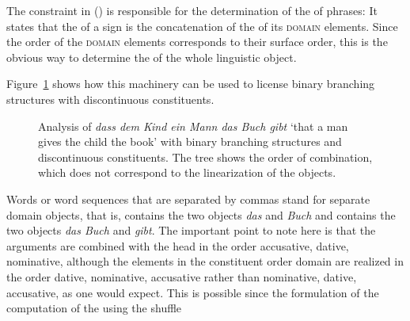 \documentclass[output=paper]{langsci/langscibook}
\begin{document}
The constraint in () is responsible for the determination of the \phonvs of phrases:
\ea
{} \impl
{}
\z
It states that the \phonv of a sign is the concatenation of the \phonvs of its \textsc{domain}
elements. Since the order of the \textsc{domain} elements corresponds to their surface order, this is
the obvious way to determine the \phonv of the whole linguistic object. 

Figure~\ref{fig-the-child-reads-the-book-reape-binary} shows how this machinery can be used to license binary
branching structures with discontinuous constituents.
\begin{figure}
\caption{\label{fig-the-child-reads-the-book-reape-binary}Analysis of \emph{dass dem Kind ein Mann das Buch
    gibt} `that a man gives the child the book' with binary branching structures and discontinuous
  constituents. The tree shows the order of combination, which does not correspond to the
  linearization of the \domain objects.}
\end{figure}%
Words or word sequences that are separated by commas stand for separate domain objects, that is,
 contains the two objects \emph{das} and \emph{Buch} and  contains the two objects \emph{das Buch} and \emph{gibt}.
The important point to note here is that the arguments are combined with the head in the order
accusative, dative, nominative, although the elements in the constituent order domain are realized in
the order dative, nominative, accusative rather than nominative, dative, accusative, as one would
expect. This is possible since the formulation of the computation of the \domv using the shuffle
\end{document}
